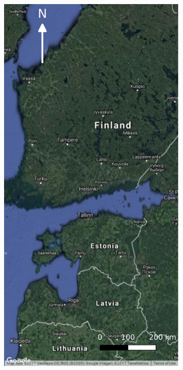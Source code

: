 \documentclass[a4paper,12pt]{scrbook}
\begin{document}
\begin{figure}
  \centering
  \begin{subfigure}[t]{.24\textwidth}
    \includegraphics[width=\textwidth]{thesis-figures/figures-qgis/fulltile-google}

\end{subfigure}
\end{figure}
\end{document}
